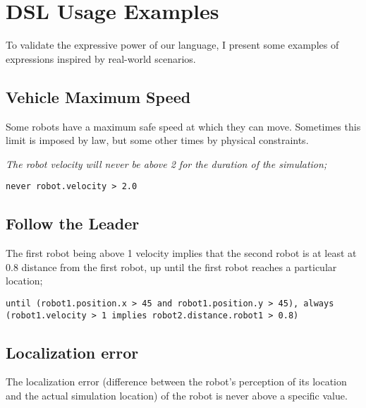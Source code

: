 \section{DSL Usage Examples}
\label{sec:languageexamples}
To validate the expressive power of our language, I present some examples of expressions inspired by real-world scenarios.


\subsection{Vehicle Maximum Speed}
\label{sec:speedexample}

Some robots have a maximum safe speed at which they can move. Sometimes this limit is imposed by law, but some other times by physical constraints.

\textit{The robot velocity will never be above 2 for the duration of the simulation;}

\begin{lstlisting}
never robot.velocity > 2.0	
\end{lstlisting}


\subsection{Follow the Leader}
\label{ssec:followexample}

The first robot being above 1 velocity implies that the second robot is at least at 0.8 distance from the first robot, up until the first robot reaches a particular location;

\begin{lstlisting}
until (robot1.position.x > 45 and robot1.position.y > 45), always (robot1.velocity > 1 implies robot2.distance.robot1 > 0.8)
\end{lstlisting}


\subsection{Localization error}
\label{ssec:localizationexample}

The localization error (difference between the robot's perception of its location and the actual simulation location) of the robot is never above a specific value.

